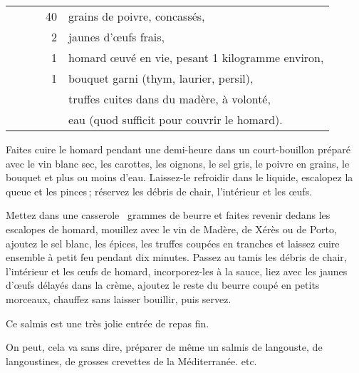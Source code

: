 \begin{longtable}{rrrrp{16em}}
  &       &         & 40 & grains de poivre, concassés,                                                   \\
  &       &         &  2 & jaunes d'œufs frais,                                                           \\
  &       &         &  1 & homard œuvé en vie, pesant 1 kilogramme environ,                               \\
  &       &         &  1 & bouquet garni (thym, laurier, persil),                                         \\
  &       &         &    & truffes cuites dans du madère, à volonté,                                      \\
  &       &         &    & eau (quod sufficit pour couvrir le homard).                                    \\
\end{longtable}
\normalsize


Faites cuire le homard pendant une demi-heure dans un court-bouillon préparé
avec le vin blanc sec, les carottes, les oignons, le sel gris, le poivre en
grains, le bouquet et plus ou moins d'eau. Laissez-le refroidir dans le
liquide, escalopez la queue et les pinces ; réservez les débris de chair,
l'intérieur et les œufs.

Mettez dans une casserole {\mmm} grammes de beurre et faites revenir dedans les
escalopes de homard, mouillez avec le vin de Madère, de Xérès ou de Porto,
ajoutez le sel blanc, les épices, les truffes coupées en tranches et laissez
cuire ensemble à petit feu pendant dix minutes. Passez au tamis les débris de
chair, l'intérieur et les œufs de homard, incorporez-les à la sauce, liez avec
les jaunes d'œufs délayés dans la crème, ajoutez le reste du beurre coupé en
petits morceaux, chauffez sans laisser bouillir, puis servez.

Ce salmis est une très jolie entrée de repas fin.

\sk


On peut, cela va sans dire, préparer de même un salmis de langouste, de
langoustines, de grosses crevettes de la Méditerranée. etc.

